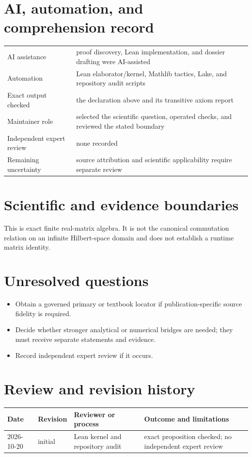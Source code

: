 \documentclass[11pt]{article}
\begin{document}
\section{AI, automation, and comprehension record}
\begin{tabularx}{\textwidth}{@{}lY@{}}\toprule
AI assistance & proof discovery, Lean implementation, and dossier drafting were AI-assisted \\
Automation & Lean elaborator/kernel, Mathlib tactics, Lake, and repository audit scripts \\
Exact output checked & the declaration above and its transitive axiom report \\
Maintainer role & selected the scientific question, operated checks, and reviewed the stated boundary \\
Independent expert review & none recorded \\
Remaining uncertainty & source attribution and scientific applicability require separate review \\
\bottomrule\end{tabularx}

\section{Scientific and evidence boundaries}
This is exact finite real-matrix algebra. It is not the canonical commutation relation on an infinite Hilbert-space domain and does not establish a runtime matrix identity.

\section{Unresolved questions}
\begin{itemize}
\item Obtain a governed primary or textbook locator if publication-specific source fidelity is required.
\item Decide whether stronger analytical or numerical bridges are needed; they must receive separate statements and evidence.
\item Record independent expert review if it occurs.
\end{itemize}

\section{Review and revision history}
\begin{tabularx}{\textwidth}{@{}lllX@{}}\toprule
Date & Revision & Reviewer or process & Outcome and limitations \\
\midrule
2026-10-20 & initial & Lean kernel and repository audit & exact proposition checked; no independent expert review \\
\bottomrule\end{tabularx}
\end{document}
